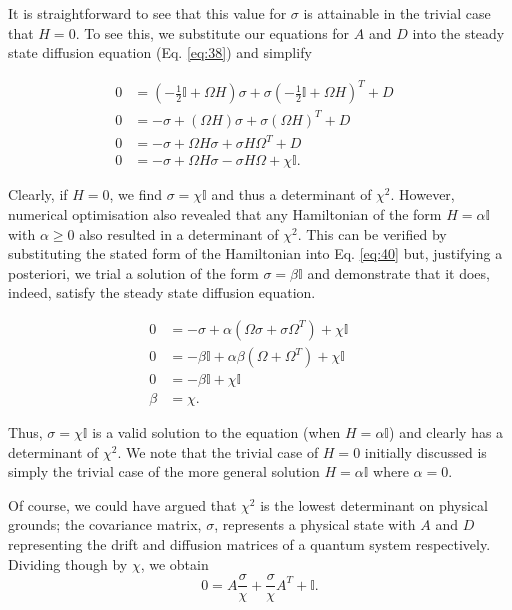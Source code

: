 \documentclass[11pt,a4paper]{article}
\numberwithin{equation}{section}
\begin{document}
	It is straightforward to see that this value for $\sigma$ is attainable in the trivial case that $H=0$. To see this, we substitute our equations for $A$ and $D$ into the steady state diffusion equation (Eq. \ref{eq:38}) and simplify
	

	\begin{align}	
	0 &= (-\frac{1}{2}\mathbb{I} + \Omega H)\sigma +\sigma (-\frac{1}{2}\mathbb{I} + \Omega H)^{T} + D&\nonumber\\
	0 &= -\sigma + (\Omega H)\sigma +\sigma (\Omega H)^{T} + D& \nonumber\\
	0 &= -\sigma + \Omega H\sigma +\sigma H\Omega^{T} + D \nonumber&\\
	0 &= -\sigma + \Omega H\sigma -\sigma H\Omega + \chi \mathbb{I}. &
	\end{align}
	
	Clearly, if $H=0$, we find $\sigma = \chi \mathbb{I}$ and thus a determinant of $\chi^2$. However, numerical optimisation also revealed that any Hamiltonian of the form $H=\alpha\mathbb{I}$ with $\alpha \geq0$ also resulted in a determinant of  $\chi^2$. This can be verified by substituting the stated form of the Hamiltonian into Eq. \ref{eq:40} but, justifying a posteriori, we trial a solution of the form $\sigma=\beta\mathbb{I}$ and demonstrate that it does, indeed, satisfy the steady state diffusion equation. 
	
	\begin{align*}
	0 &= -\sigma + \alpha (\Omega \sigma + \sigma \Omega^{T}) + \chi \mathbb{I}&\\
	0 &= -\beta \mathbb{I} + \alpha \beta (\Omega + \Omega^T) + \chi \mathbb{I}&\\
	0 & = -\beta \mathbb{I} + \chi \mathbb{I} & \tag*{as $\Omega$ is anti-symmetric}&\\
	\beta &= \chi.&
	\end{align*}
	
	Thus, $\sigma=\chi\mathbb{I}$ is a valid solution to the equation (when $H=\alpha\mathbb{I}$) and clearly has a determinant of $\chi^2$. We note that the trivial case of $H=0$ initially discussed is simply the trivial case of the more general solution $H=\alpha\mathbb{I}$ where $\alpha=0$.
	
	Of course, we could have argued that $\chi^2$ is the lowest determinant on physical grounds; the covariance matrix, $\sigma$, represents a physical state with $A$ and $D$ representing the drift and diffusion matrices of a quantum system respectively. Dividing though by $\chi$, we obtain
	\begin{equation*}
	0 = A \frac{\sigma}{\chi} + \frac{\sigma}{\chi} A^T + \mathbb{I}.
	\end{equation*}
	
\end{document}
